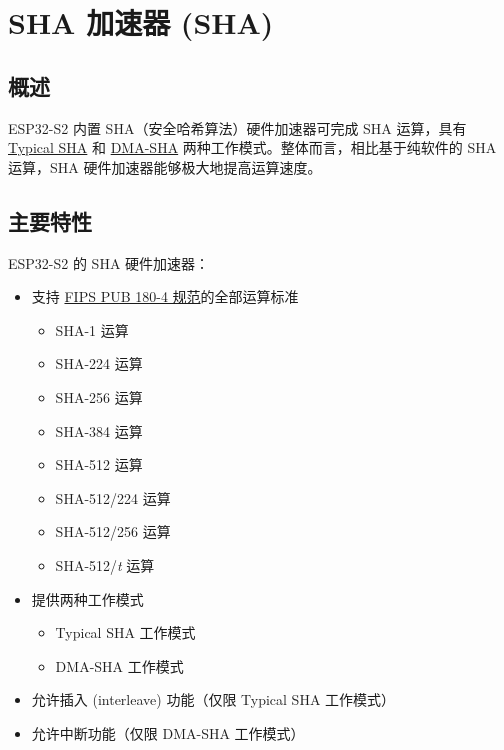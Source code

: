 \documentclass[main\_\_CN.tex]{subfiles}
\begin{document}
\setchineseformatting

\ifglobal
\else
    \listoftodos
    {\let\clearpage\relax \listofdonetodos}
    \tableofcontents
\fi




\hypertarget{sha}{}
\chapter{SHA 加速器 (SHA)}
\label{mod:sha}

\section{概述}

ESP32-S2 内置 SHA（安全哈希算法）硬件加速器可完成 SHA 运算，具有 \hyperref[subsection:typicalsha]{Typical SHA} 和 \hyperref[subsection:dma-sha]{DMA-SHA} 两种工作模式。整体而言，相比基于纯软件的 SHA 运算，SHA 硬件加速器能够极大地提高运算速度。

\section{主要特性}

ESP32-S2 的 SHA 硬件加速器：

\begin{itemize}
    \item 支持 \href{https://doi.org/10.6028/NIST.FIPS.180-4}{FIPS PUB 180-4 规范}的全部运算标准
    \begin{itemize}
        \item SHA-1 运算
        \item SHA-224 运算
        \item SHA-256 运算
        \item SHA-384 运算
        \item SHA-512 运算
        \item SHA-512/224 运算
        \item SHA-512/256 运算
        \item SHA-512/{\it{t}} 运算
    \end{itemize}
    \item 提供两种工作模式
    \begin{itemize}
        \item Typical SHA 工作模式
        \item DMA-SHA 工作模式
    \end{itemize}
    \item 允许插入 (interleave) 功能（仅限 Typical SHA 工作模式）
    \item 允许中断功能（仅限 DMA-SHA 工作模式）
\end{itemize}
\end{document}

